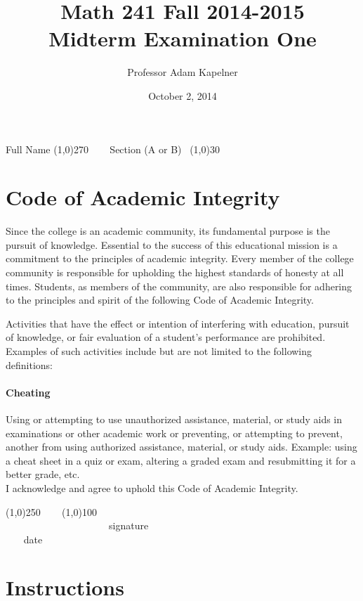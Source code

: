 \documentclass[12pt]{article}
\title{Math 241 Fall 2014-2015 \\ Midterm Examination One}
\author{Professor Adam Kapelner}
\date{October 2, 2014}
\begin{document}
\maketitle

\noindent Full Name \line(1,0){270} ~~~ Section (A or B)~ \line(1,0){30}

\thispagestyle{empty}

\section*{Code of Academic Integrity}

\footnotesize
Since the college is an academic community, its fundamental purpose is the pursuit of knowledge. Essential to the success of this educational mission is a commitment to the principles of academic integrity. Every member of the college community is responsible for upholding the highest standards of honesty at all times. Students, as members of the community, are also responsible for adhering to the principles and spirit of the following Code of Academic Integrity.

Activities that have the effect or intention of interfering with education, pursuit of knowledge, or fair evaluation of a student's performance are prohibited. Examples of such activities include but are not limited to the following definitions:

\paragraph{Cheating} Using or attempting to use unauthorized assistance, material, or study aids in examinations or other academic work or preventing, or attempting to prevent, another from using authorized assistance, material, or study aids. Example: using a cheat sheet in a quiz or exam, altering a graded exam and resubmitting it for a better grade, etc.
\\

\noindent I acknowledge and agree to uphold this Code of Academic Integrity. \\

\begin{center}
\line(1,0){250} ~~~ \line(1,0){100}\\
~~~~~~~~~~~~~~~~~~~~~signature~~~~~~~~~~~~~~~~~~~~~~~~~~~~~~~~~~~~~~~~~~~~~ date
\end{center}

\normalsize

\section*{Instructions}
\end{document}
